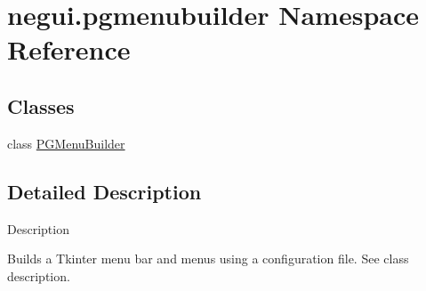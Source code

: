 \hypertarget{namespacenegui_1_1pgmenubuilder}{}\section{negui.\+pgmenubuilder Namespace Reference}
\label{namespacenegui_1_1pgmenubuilder}
\subsection*{Classes}
\begin{DoxyCompactItemize}
\item 
class \hyperlink{classnegui_1_1pgmenubuilder_1_1PGMenuBuilder}{P\+G\+Menu\+Builder}
\end{DoxyCompactItemize}


\subsection{Detailed Description}
\begin{DoxyVerb}Description

Builds a Tkinter menu bar and menus using a configuration file.  See class description.\end{DoxyVerb}
 